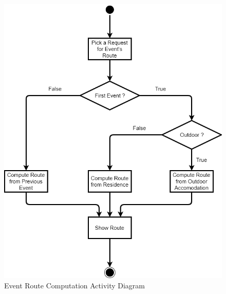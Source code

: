 \newpage
{}
\begin{figure}[H]
	\centering
	\includegraphics[scale=0.4]{Images/Activity/Event_Route_Computation}
	\caption{Event Route Computation Activity Diagram}
\end{figure}

